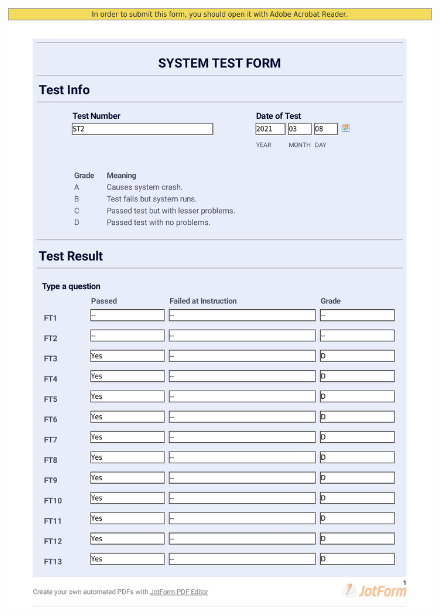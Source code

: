 \documentclass{article}
\begin{document}
 
 \begin{figure}
     \centering
    \includegraphics[trim={0cm 3.5cm 0cm 2cm}, clip,width=13cm]{images/2021-03-08_Malte_ST2-1}
     \renewcommand\figurename{Figure}
     \label{fig:my_label}
 \end{figure}
 
\end{document}
